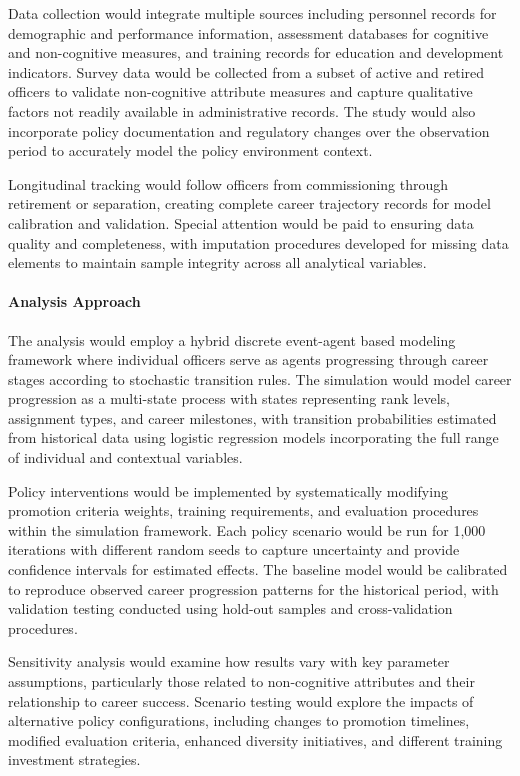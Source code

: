 \documentclass[main.tex]{subfiles}
\begin{document}
Data collection would integrate multiple sources including personnel records for demographic and performance information, assessment databases for cognitive and non-cognitive measures, and training records for education and development indicators. Survey data would be collected from a subset of active and retired officers to validate non-cognitive attribute measures and capture qualitative factors not readily available in administrative records. The study would also incorporate policy documentation and regulatory changes over the observation period to accurately model the policy environment context.

Longitudinal tracking would follow officers from commissioning through retirement or separation, creating complete career trajectory records for model calibration and validation. Special attention would be paid to ensuring data quality and completeness, with imputation procedures developed for missing data elements to maintain sample integrity across all analytical variables.

\paragraph{Analysis Approach}

The analysis would employ a hybrid discrete event-agent based modeling framework where individual officers serve as agents progressing through career stages according to stochastic transition rules\autocite{career-model}. The simulation would model career progression as a multi-state process with states representing rank levels, assignment types, and career milestones, with transition probabilities estimated from historical data using logistic regression models incorporating the full range of individual and contextual variables.

Policy interventions would be implemented by systematically modifying promotion criteria weights, training requirements, and evaluation procedures within the simulation framework. Each policy scenario would be run for 1,000 iterations with different random seeds to capture uncertainty and provide confidence intervals for estimated effects. The baseline model would be calibrated to reproduce observed career progression patterns for the historical period, with validation testing conducted using hold-out samples and cross-validation procedures.

Sensitivity analysis would examine how results vary with key parameter assumptions, particularly those related to non-cognitive attributes and their relationship to career success. Scenario testing would explore the impacts of alternative policy configurations, including changes to promotion timelines, modified evaluation criteria, enhanced diversity initiatives, and different training investment strategies.
\end{document}
